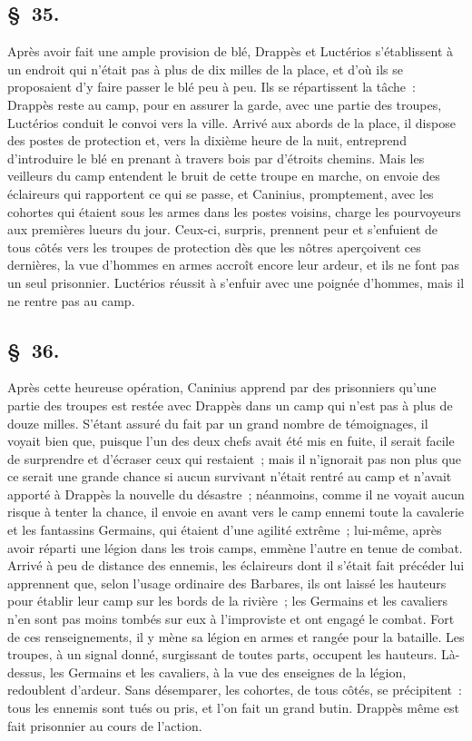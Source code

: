 \documentclass[french,twoside]{book} %
\begin{document}
\subsection[{§ 35.}]{ \textsc{§ 35.} }
\noindent Après avoir fait une ample provision de blé, Drappès et Luctérios s’établissent à un endroit qui n’était pas à plus de dix milles de la place, et d’où ils se proposaient d’y faire passer le blé peu à peu. Ils se répartissent la tâche : Drappès reste au camp, pour en assurer la garde, avec une partie des troupes, Luctérios conduit le convoi vers la ville. Arrivé aux abords de la place, il dispose des postes de protection et, vers la dixième heure de la nuit, entreprend d’introduire le blé en prenant à travers bois par d’étroits chemins. Mais les veilleurs du camp entendent le bruit de cette troupe en marche, on envoie des éclaireurs qui rapportent ce qui se passe, et Caninius, promptement, avec les cohortes qui étaient sous les armes dans les postes voisins, charge les pourvoyeurs aux premières lueurs du jour. Ceux-ci, surpris, prennent peur et s’enfuient de tous côtés vers les troupes de protection dès que les nôtres aperçoivent ces dernières, la vue d’hommes en armes accroît encore leur ardeur, et ils ne font pas un seul prisonnier. Luctérios réussit à s’enfuir avec une poignée d’hommes, mais il ne rentre pas au camp.
\subsection[{§ 36.}]{ \textsc{§ 36.} }
\noindent Après cette heureuse opération, Caninius apprend par des prisonniers qu’une partie des troupes est restée avec Drappès dans un camp qui n’est pas à plus de douze milles. S'étant assuré du fait par un grand nombre de témoignages, il voyait bien que, puisque l’un des deux chefs avait été mis en fuite, il serait facile de surprendre et d’écraser ceux qui restaient ; mais il n’ignorait pas non plus que ce serait une grande chance si aucun survivant n’était rentré au camp et n’avait apporté à Drappès la nouvelle du désastre ; néanmoins, comme il ne voyait aucun risque à tenter la chance, il envoie en avant vers le camp ennemi toute la cavalerie et les fantassins Germains, qui étaient d’une agilité extrême ; lui-même, après avoir réparti une légion dans les trois camps, emmène l’autre en tenue de combat. Arrivé à peu de distance des ennemis, les éclaireurs dont il s’était fait précéder lui apprennent que, selon l’usage ordinaire des Barbares, ils ont laissé les hauteurs pour établir leur camp sur les bords de la rivière ; les Germains et les cavaliers n’en sont pas moins tombés sur eux à l’improviste et ont engagé le combat. Fort de ces renseignements, il y mène sa légion en armes et rangée pour la bataille. Les troupes, à un signal donné, surgissant de toutes parts, occupent les hauteurs. Là-dessus, les Germains et les cavaliers, à la vue des enseignes de la légion, redoublent d’ardeur. Sans désemparer, les cohortes, de tous côtés, se précipitent : tous les ennemis sont tués ou pris, et l’on fait un grand butin. Drappès même est fait prisonnier au cours de l’action.
\end{document}
